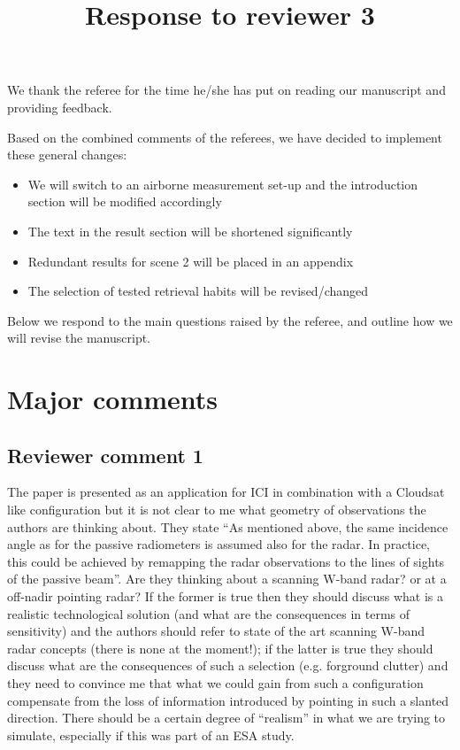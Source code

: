 \documentclass[11pt]{scrartcl}
\author{}
\date{}
\title{Response to reviewer 3}
\begin{document}
\maketitle

\setlength{\parindent}{0cm}

We thank the referee for the time he/she has put on reading our manuscript and
providing feedback.

Based on the combined comments of the referees, we have decided to implement
these general changes:

\begin{itemize}
\item We will switch to an airborne measurement set-up and
  the introduction section will be modified accordingly
\item The text in the result section will be shortened significantly
\item Redundant results for scene 2 will be placed in an appendix
\item The selection of tested retrieval habits will be revised/changed
\end{itemize}

Below we respond to the main questions raised by the referee, and outline how we
will revise the manuscript.

\section*{Major comments}

\subsection*{Reviewer comment 1}

The paper is presented as an application for ICI in combination with a
Cloudsat like configuration but it is not clear to me what geometry of
observations the authors are thinking about. They state “As mentioned above, the
same incidence angle as for the passive radiometers is assumed also for the
radar. In practice, this could be achieved by remapping the radar observations to
the lines of sights of the passive beam”. Are they thinking about a scanning
W-band radar? or at a off-nadir pointing radar? If the former is true then they
should discuss what is a realistic technological solution (and what are the
consequences in terms of sensitivity) and the authors should refer to state of
the art scanning W-band radar concepts (there is none at the moment!); if the
latter is true they should discuss what are the consequences of such a selection
(e.g. forground clutter) and they need to convince me that what we could gain
from such a configuration compensate from the loss of information introduced by
pointing in such a slanted direction. There should be a certain degree of
“realism” in what we are trying to simulate, especially if this was part of an
ESA study.
\end{document}
